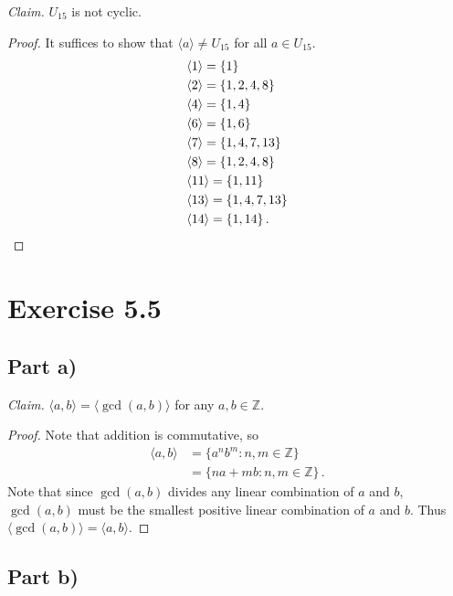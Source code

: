 \documentclass{abrice}
\newcommand{\Z}{\mathbb{Z}}
\begin{document}
\noindent
\textit{Claim.} $U_{15}$ is not cyclic.

\begin{proof}
  It suffices to show that $\langle a \rangle \neq U_{15}$ for all $a \in
  U_{15}$.%
  \begin{align*}
    & \langle 1 \rangle = \{ 1 \} \\
    & \langle 2 \rangle = \{ 1, 2, 4, 8 \} \\
    & \langle 4 \rangle = \{ 1, 4 \} \\
    & \langle 6 \rangle = \{ 1, 6 \} \\
    & \langle 7 \rangle = \{ 1, 4, 7, 13 \} \\
    & \langle 8 \rangle = \{ 1, 2, 4, 8 \} \\
    & \langle 11 \rangle = \{ 1, 11 \} \\
    & \langle 13 \rangle = \{ 1, 4, 7, 13 \} \\
    & \langle 14 \rangle = \{ 1, 14 \}\, . \qedhere
  \end{align*}
\end{proof}

\section{Exercise 5.5}

\subsection{Part a)}

\textit{Claim.} $\langle a, b \rangle = \langle \gcd(a, b) \rangle$ for any $a,b
\in \Z$.

\begin{proof}
  Note that addition is commutative, so
  \begin{align*}
    \langle a, b \rangle
    & = \{ a^n b^m : n, m \in \Z \} \\
    & = \{ na + mb : n, m \in \Z \}\, .
  \end{align*}
  Note that since $\gcd(a, b)$ divides any linear combination of $a$ and $b$,
  $\gcd(a,b)$ must be the smallest positive linear combination of $a$ and $b$.
  Thus $\langle \gcd(a,b) \rangle = \langle a, b \rangle$.
\end{proof}

\subsection{Part b)}
\end{document}
